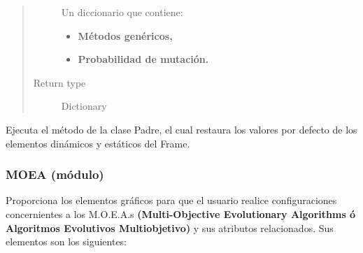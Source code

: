 \documentclass[class=report, crop=false]{standalone}
\begin{document}
\begin{fulllineitems}
\begin{fulllineitems}
\begin{quote}
\begin{description}
Un diccionario que contiene:

\begin{itemize}
\item \textbf{Métodos genéricos,}
\item \textbf{Probabilidad de mutación.}
\end{itemize}

\item[{Return type}] \leavevmode
Dictionary
\end{description}\end{quote}

\end{fulllineitems}

\begin{fulllineitems}

Ejecuta el método de la clase Padre, el cual restaura 
los valores por defecto de los elementos dinámicos y 
estáticos del Frame.

\end{fulllineitems}

\end{fulllineitems}

\subsubsection{MOEA (módulo)}
\label{sec:a_3_2_6}
Proporciona los elementos gráficos para que el usuario 
realice configuraciones concernientes a los M.O.E.A.s \textbf{(Multi-Objective Evolutionary Algorithms
ó Algoritmos Evolutivos Multiobjetivo)} y sus atributos 
relacionados.\break
Sus elementos son los siguientes:

\end{document}
